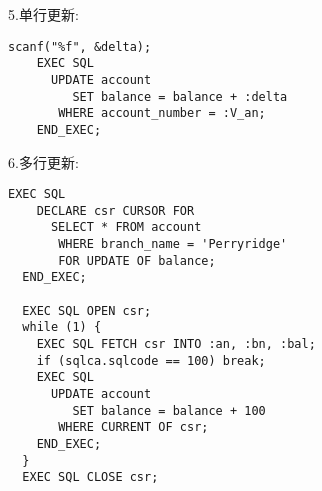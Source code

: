 5.单行更新:
\begin{lstlisting}[style=cppstyle]
    scanf("%f", &delta);
    EXEC SQL
      UPDATE account
         SET balance = balance + :delta
       WHERE account_number = :V_an;
    END_EXEC;        
\end{lstlisting}

6.多行更新:
\begin{lstlisting}[style=cppstyle]
    EXEC SQL
    DECLARE csr CURSOR FOR
      SELECT * FROM account
       WHERE branch_name = 'Perryridge'
       FOR UPDATE OF balance; 
  END_EXEC;
  
  EXEC SQL OPEN csr;
  while (1) {
    EXEC SQL FETCH csr INTO :an, :bn, :bal;
    if (sqlca.sqlcode == 100) break;
    EXEC SQL
      UPDATE account
         SET balance = balance + 100
       WHERE CURRENT OF csr;
    END_EXEC;
  }
  EXEC SQL CLOSE csr;     
\end{lstlisting}